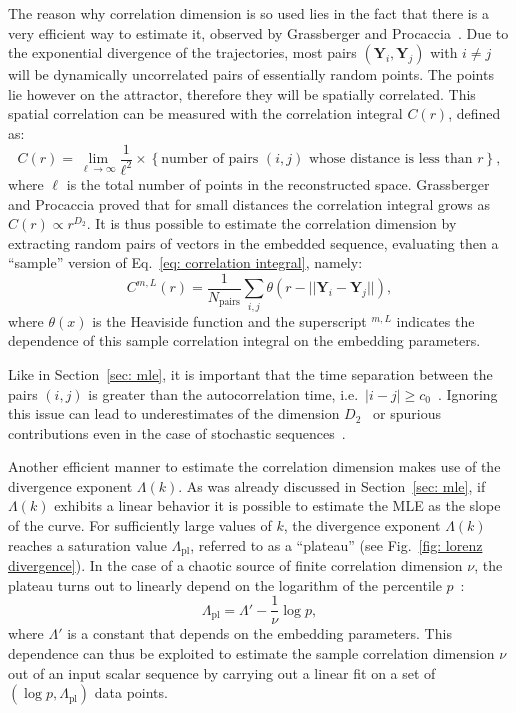 The reason why correlation dimension is so used lies in the fact that there is a very
efficient way to estimate it, observed by Grassberger and Procaccia~\cite{ref:grassberger1983measuring}.
Due to the exponential divergence of the trajectories, most pairs
$(\mathbf{Y}_i,\mathbf{Y}_j)$ with $i\neq j$ will be dynamically uncorrelated
pairs of essentially random points. The points lie however on the attractor, therefore they will be
spatially correlated. This spatial correlation can be measured with the correlation integral
$C(r)$, defined as:
\begin{equation}
    \label{eq: correlation integral}
    C(r) = \lim_{\ell\rightarrow\infty} \frac{1}{\ell^2}\times\left\{
        \text{number of pairs $(i,j)$ whose distance is less than $r$}
    \right\},
\end{equation}
where $\ell$ is the total number of points in the reconstructed space.
Grassberger and Procaccia proved that for small distances the correlation integral grows as
$C(r)\propto r^{D_2}$. It is thus possible to estimate the correlation dimension
by extracting random pairs of vectors in the embedded sequence, evaluating then a ``sample''
version of Eq.~\ref{eq: correlation integral}, namely:
\begin{equation}
    \label{eq: sample correlation integral}
    C^{m,L}(r)=\frac{1}{N_{\text{pairs}}}\sum_{i,j}\theta\left(
        r-||\mathbf{Y}_i-\mathbf{Y}_j||
    \right),
\end{equation}
where $\theta(x)$ is the Heaviside function and the superscript $^{m,L}$ indicates the dependence of this
sample correlation integral on the embedding parameters. 

Like in Section~\ref{sec: mle}, it is important that the time separation between
the pairs $(i,j)$ is greater than the autocorrelation time, i.e.\ $|i-j|\geq c_0$~\cite{ref:theiler1986spurious,ref:albano1995kolmogorov}.
Ignoring this issue can lead to underestimates of the dimension $D_2$~\cite{ref:theiler1986spurious}
or spurious contributions even in the case of stochastic sequences~\cite{ref:osborne1989finite}.

Another efficient manner to estimate the correlation dimension makes use of the divergence exponent
$\Lambda(k)$. As was already discussed in Section~\ref{sec: mle}, if $\Lambda(k)$ exhibits a
linear behavior it is possible to estimate the MLE as the slope of the curve.
For sufficiently large values of $k$, the divergence exponent $\Lambda(k)$
reaches a saturation value $\Lambda_{\text{pl}}$, referred to as a ``plateau'' (see Fig.~\ref{fig: lorenz divergence}).
In the case of a chaotic source of finite correlation dimension $\nu$, the plateau
turns out to linearly depend on the logarithm of the percentile $p$~\cite{ref:perinelli2020chasing}:
\begin{equation}
    \label{eq: Lambda plateau}
    \Lambda_{\text{pl}}=\Lambda'-\frac{1}{\nu}\log p,
\end{equation}
where $\Lambda'$ is a constant that depends on the embedding parameters.
This dependence can thus be exploited to estimate the
sample correlation dimension $\nu$ out of an input scalar sequence by
carrying out a linear fit on a set of $(\log p, \Lambda_{\text{pl}})$ data points.


